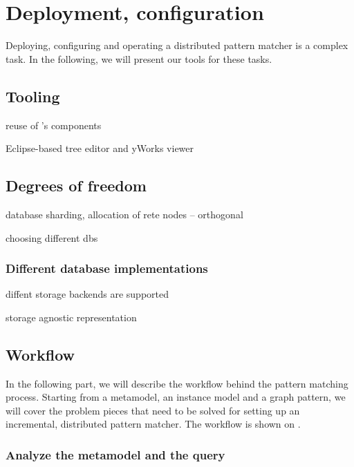 \section{Deployment, configuration}
\label{sec:deployment-configuration}

Deploying, configuring and operating a distributed pattern matcher is a complex task. In the following, we will present our tools for these tasks. 

\subsection{Tooling}



reuse of \eiq's components

Eclipse-based tree editor and yWorks viewer





\subsection{Degrees of freedom}

database sharding, allocation of rete nodes -- orthogonal

choosing different dbs

\subsubsection{Different database implementations}

diffent storage backends are supported

storage agnostic representation



\subsection{Workflow} %

In the following part, we will describe the workflow behind the pattern matching process. Starting from a metamodel, an instance model and a graph pattern, we will cover the problem pieces that need to be solved for setting up an incremental, distributed pattern matcher. The workflow is shown on .


\subsubsection{Analyze the metamodel and the query}

